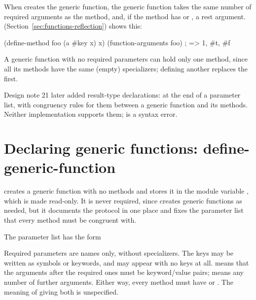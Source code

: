 \noindent When  creates the generic function, the
generic function takes the same number of required arguments as the method,
and, if the method has  or , a rest argument.
 (Section~\ref{sec:functions-reflection}) shows this:

\begin{dylan}
(define-method foo (a #key x) x)
(function-arguments foo)       ; => 1, #t, #f
\end{dylan}

\noindent A generic function with no required parameters can hold only one
method, since all its methods have the same (empty) specializers; defining
another replaces the first.

\begin{notebox}
Design note 21 later added result-type declarations:  at the
end of a parameter list, with congruency rules for them between a generic
function and its methods. Neither implementation supports them;
 is a syntax error.
\end{notebox}

\section{Declaring generic functions: define-generic-function}\label{sec:functions-define-generic}

\begin{quote}
\end{quote}

\noindent {} creates a generic function with no
methods and stores it in the module variable , which is made
read-only. It is never required, since  creates generic
functions as needed, but it documents the protocol in one place and fixes
the parameter list that every method must be congruent with.

The parameter list has the form

\begin{quote}
\end{quote}

\noindent Required parameters are names only, without specializers. The
keys may be written as symbols or keywords, and  may appear with
no keys at all.  means that the arguments after the required
ones must be keyword/value pairs;  means any number of further
arguments. Either way, every method must have  or .
The meaning of giving both is unspecified.


